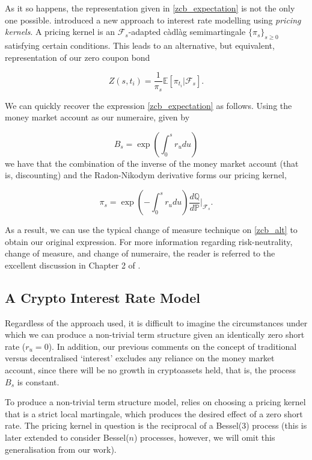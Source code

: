 As it so happens, the representation given in \ref{zcb_expectation} is not the only one possible. \cite{constantinides1992theory} introduced a new approach to interest rate modelling using \textit{pricing kernels}. A pricing kernel is an $\mathcal{F}_s$-adapted càdlàg semimartingale $\{ \pi_s \}_{s \geq 0}$ satisfying certain conditions. This leads to an alternative, but equivalent, representation of our zero coupon bond

\begin{equation}
\label{zcb_alt}
    Z(s,t_i) = \frac{1}{\pi_s} \mathbb{E} \left[ \pi_{t_i} \vert \mathcal{F}_s \right].
\end{equation}

We can quickly recover the expression \ref{zcb_expectation} as follows. Using the money market account as our numeraire, given by

\begin{equation}
    B_s = \exp \left( \int_0^s r_u du \right)
\end{equation}
we have that the combination of the inverse of the money market account (that is, discounting) and the Radon-Nikodym derivative forms our pricing kernel,

\begin{equation}
    \pi_s = \exp \left( -\int_0^s r_u du \right) \frac{d \mathbb{Q}}{d \mathbb{P}} \bigg \vert_{\mathcal{F}_s}.
\end{equation}

As a result, we can use the typical change of measure technique on \ref{zcb_alt} to obtain our original expression. For more information regarding risk-neutrality, change of measure, and change of numeraire, the reader is referred to the excellent discussion in Chapter 2 of \cite{brigo2001interest}.

\subsection{A Crypto Interest Rate Model}
Regardless of the approach used, it is difficult to imagine the circumstances under which we can produce a non-trivial term structure given an identically zero short rate ($r_u = 0$). In addition, our previous comments on the concept of traditional versus decentralised `interest' excludes any reliance on the money market account, since there will be no growth in cryptoassets held, that is, the process $B_s$ is constant.

To produce a non-trivial term structure model, \cite{brody2020theory} relies on choosing a pricing kernel that is a strict local martingale, which produces the desired effect of a zero short rate. The pricing kernel in question is the reciprocal of a Bessel(3) process (this is later extended to consider Bessel($n$) processes, however, we will omit this generalisation from our work). 

